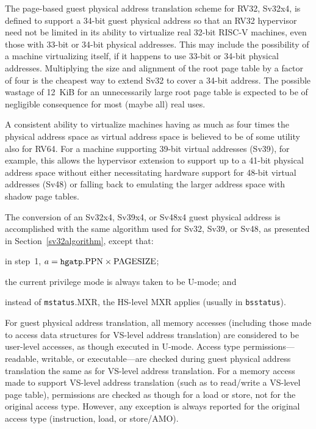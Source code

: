 \begin{commentary}
The page-based guest physical address translation scheme for RV32, Sv32x4, is
defined to support a 34-bit guest physical address so that an RV32 hypervisor
need not be limited in its ability to virtualize real 32-bit RISC-V machines,
even those with 33-bit or 34-bit physical addresses.
This may include the possibility of a machine virtualizing itself, if it
happens to use 33-bit or 34-bit physical addresses.
Multiplying the size and alignment of the root page table by a factor of four
is the cheapest way to extend Sv32 to cover a 34-bit address.
The possible wastage of 12~KiB for an unnecessarily large root page table is
expected to be of negligible consequence for most (maybe all) real uses.

A consistent ability to virtualize machines having as much as four times the
physical address space as virtual address space is believed to be of some
utility also for RV64.
For a machine supporting 39-bit virtual addresses (Sv39), for example, this
allows the hypervisor extension to support up to a 41-bit physical address
space without either necessitating hardware support for 48-bit virtual
addresses (Sv48) or falling back to emulating the larger address space with
shadow page tables.
\end{commentary}

The conversion of an Sv32x4, Sv39x4, or Sv48x4 guest physical address is
accomplished with the same algorithm used for Sv32, Sv39, or Sv48, as presented
in Section~\ref{sv32algorithm}, except that:
\begin{compactitem}
\item
in step~1, $a = \mbox{{\tt hgatp}.PPN}\times\mbox{PAGESIZE}$;
\item
the current privilege mode is always taken to be U-mode; and
\item
instead of {\tt mstatus}.MXR, the HS-level MXR applies (usually in
{\tt bsstatus}).
\end{compactitem}

For guest physical address translation, all memory accesses (including those
made to access data structures for VS-level address translation) are considered
to be user-level accesses, as though executed in U-mode.
Access type permissions---readable, writable, or executable---are checked
during guest physical address translation the same as for VS-level address
translation.
For a memory access made to support VS-level address translation (such as to
read/write a VS-level page table), permissions are checked as though for a load
or store, not for the original access type.
However, any exception is always reported for the original access type
(instruction, load, or store/AMO).

